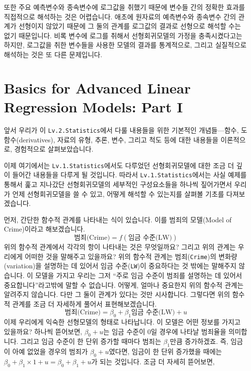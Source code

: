 \documentclass[
]{book}
\begin{document}
또한 주요 예측변수와 종속변수에 로그값을 취했기 때문에 변수들 간의 정확한 효과를 직접적으로 해석하는 것은 어렵습니다. 애초에 원자료의 예측변수와 종속변수 간의 관계가 선형이지 않았기 때문에 그 둘의 관계를 로그값의 결과로 선형으로 해석할 수는 없기 때문입니다. 비록 변수에 로그를 취해서 선형회귀모델의 가정을 충족시켰다고는 하지만, 로그값을 취한 변수들을 사용한 모델의 결과를 통계적으로, 그리고 실질적으로 해석하는 것은 또 다른 문제입니다.

\hypertarget{basics-for-advanced-linear-regression-models-part-i}{%
\chapter{Basics for Advanced Linear Regression Models: Part I}\label{basics-for-advanced-linear-regression-models-part-i}}

앞서 우리가 이 \texttt{Lv.2.Statistics}에서 다룰 내용들을 위한 기본적인 개념들---함수, 도함수(derivatives), 자료의 유형, 추론, 변수, 그리고 척도 등에 대한 내용들을 이론적으로, 경험적으로 살펴보았습니다.

이제 여기에서는 \texttt{Lv.1.Statistics}에서도 다루었던 선형회귀모델에 대한 조금 더 깊이 들어간 내용들을 다루게 될 것입니다. 따라서 \texttt{Lv.1.Statistics}에서는 사실 예제를 통해서 훑고 지나갔단 선형회귀모델의 세부적인 구성요소들을 하나씩 짚어가면서 우리가 언제 선형회귀모델을 쓸 수 있고, 어떻게 해석할 수 있는지를 살펴볼 기초를 다져보겠습니다.

먼저, 간단한 함수적 관계를 나타내는 식이 있습니다. 이를 범죄의 모델(Model of Crime)이라고 해보겠습니다.
\[\text{범죄(Crime)} = f(\text{임금 수준(LW)})\]
위의 함수적 관계에서 각각의 항이 나타내는 것은 무엇일까요? 그리고 위의 관계는 우리에게 어떠한 것을 말해주고 있을까요? 위의 함수적 관계는 범죄(\texttt{Crime})의 변화량(variation)을 설명하는 데 있어서 임금 수준(\texttt{LW})이 중요하다는 것 밖에는 말해주지 않습니다. 이 모델을 가지고 우리는 그저 ``주로 임금 수준이 범죄를 설명하는 데 있어서 중요합니다''라고밖에 말할 수 없습니다. 어떻게, 얼마나 중요한지 위의 함수적 관계는 알려주지 않습니다. 다만 그 둘이 관계가 있다는 것만 시사합니다. 그렇다면 위의 함수적 관계를 조금 더 자세하게 풀어서 표현해보겠습니다.
\[\text{범죄(Crime)} = \beta_0 + \beta_1\text{임금 수준(LW)} + u\]
이제 우리에게 익숙한 선형모델의 형태로 나타납니다. 이 모델은 어떤 정보를 가지고 있을까요? 하나씩 뜯어보면, \(\beta_0 + u\)는 임금 수준이 0일 경우에 나타날 범죄율을 의미합니다. 그리고 임금 수준이 한 단위 증가할 때마다 범죄는 \(\beta_1\)만큼 증가하겠죠. 즉, 임금이 아예 없었을 경우의 범죄가 \(\beta_0 + u\)였다면, 임금이 한 단위 증가했을 때에는 \(\beta_0 + \beta_1\times1 + u = \beta_0 + \beta_1 + u\)가 되는 것입니다. 조금 더 자세히 뜯어보면,
\end{document}
